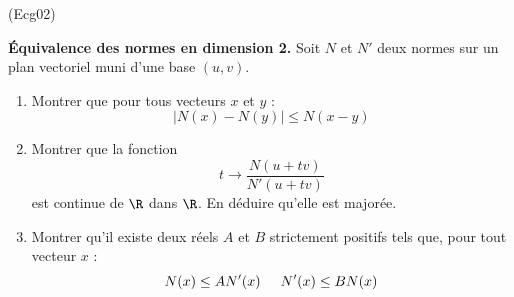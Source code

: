 \begin{tiny}(Ecg02)\end{tiny}
\textbf{\'Equivalence des normes en dimension 2.}\newline
Soit $N$ et $N'$ deux normes sur un plan vectoriel muni d'une base $(u,v)$.
 \begin{enumerate}
 \item Montrer que pour tous vecteurs $x$ et $y$ : 
\begin{displaymath}
|N(x)-N(y)|\leq N(x-y) 
\end{displaymath}
 \item Montrer que la fonction
\[t\rightarrow \frac{N(u+tv)}{N'(u+tv)}\]
est continue de $\R$ dans $\R$. En déduire qu'elle est majorée.
\item Montrer qu'il existe deux réels $A$ et $B$ strictement positifs tels que, pour tout vecteur $x$ :
\begin{displaymath}
N(x) \leq A N'(x) \hspace{0.5cm} N'(x)\leq B N(x) 
\end{displaymath}

\end{enumerate}